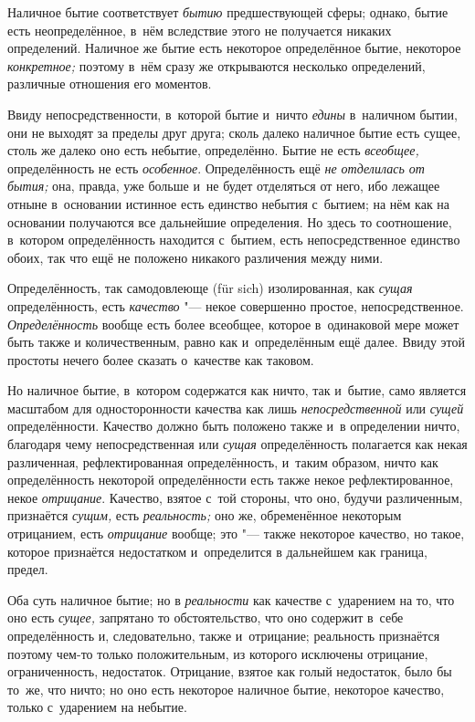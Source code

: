 Наличное бытие соответствует {\em бытию} предшествующей сферы; однако, бытие
есть неопределённое, в~нём вследствие этого не получается никаких определений.
Наличное же бытие есть некоторое определённое бытие, некоторое
{\em конкретное;} поэтому в~нём сразу же открываются несколько определений,
различные отношения его моментов.


Ввиду непосредственности, в~которой бытие и~ничто
{\em едины} в~наличном бытии, они не выходят за пределы
друг друга; сколь далеко наличное бытие есть сущее, столь же далеко оно
есть небытие, определённо. Бытие не есть {\em всеобщее,}
определённость не есть {\em особенное}. Определённость
ещё {\em не отделилась от бытия;} она, правда, уже
больше и~не будет отделяться от него, ибо лежащее отныне в~основании
истинное есть единство небытия с~бытием; на нём как на основании получаются
все дальнейшие определения. Но здесь то соотношение, в~котором
определённость находится с~бытием, есть непосредственное единство обоих,
так что ещё не положено никакого различения между ними.

Определённость, так самодовлеюще (für sich) изолированная, как
{\em сущая} определённость, есть
{\em качество} "--- некое совершенно простое,
непосредственное. {\em Определённость} вообще есть
более всеобщее, которое в~одинаковой мере может быть также и
количественным, равно как и~определённым ещё далее. Ввиду этой простоты
нечего более сказать о~качестве как таковом.

Но наличное бытие, в~котором содержатся как ничто, так и~бытие, само
является масштабом для односторонности качества как лишь
{\em непосредственной} или {\em сущей} определённости. Качество должно быть
положено также и~в определении ничто, благодаря чему непосредственная или
{\em сущая} определённость полагается как некая
различенная, рефлектированная определённость, и~таким образом, ничто как
определённость некоторой определённости есть также некое рефлектированное,
некое {\em отрицание}. Качество, взятое с~той стороны,
что оно, будучи различенным, признаётся {\em сущим,}
есть {\em реальность;} оно же, обременённое некоторым
отрицанием, есть {\em отрицание} вообще; это "--- также
некоторое качество, но такое, которое признаётся недостатком и~определится
в дальнейшем как граница, предел.

Оба суть наличное бытие; но в {\em реальности} как качестве с~ударением на то,
что оно есть {\em сущее,} запрятано то обстоятельство, что оно содержит в~себе
определённость и, следовательно, также и~отрицание; реальность признаётся
поэтому чем-то только положительным, из которого исключены отрицание,
ограниченность, недостаток. Отрицание, взятое как голый недостаток, было бы
то~же, что ничто; но оно есть некоторое наличное бытие, некоторое качество,
только с~ударением на небытие.

